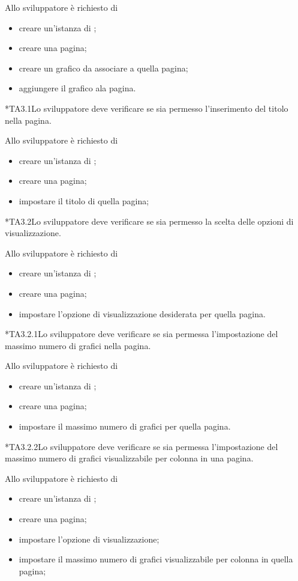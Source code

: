 		Allo sviluppatore è richiesto di
		\begin{itemize}
			\item creare un'istanza di \projectname{};
			\item creare una pagina;
			\item creare un grafico da associare a quella pagina;
			\item aggiungere il grafico ala pagina.
		\end{itemize}

	*{TA3.1}Lo sviluppatore deve verificare se sia permesso l'inserimento del titolo nella pagina.
		
		Allo sviluppatore è richiesto di
		\begin{itemize}
			\item creare un'istanza di \projectname{};
			\item creare una pagina;
			\item impostare il titolo di quella pagina;
		\end{itemize}

	*{TA3.2}Lo sviluppatore deve verificare se sia permesso la scelta delle opzioni di visualizzazione.
		
		Allo sviluppatore è richiesto di
		\begin{itemize}
			\item creare un'istanza di \projectname{};
			\item creare una pagina;
			\item impostare l'opzione di visualizzazione desiderata per quella pagina.
		\end{itemize}

	*{TA3.2.1}Lo sviluppatore deve verificare se sia permessa l'impostazione del massimo numero di grafici nella pagina.
		
		Allo sviluppatore è richiesto di
		\begin{itemize}
			\item creare un'istanza di \projectname{};
			\item creare una pagina;
			\item impostare il massimo numero di grafici per quella pagina.
		\end{itemize}

	*{TA3.2.2}Lo sviluppatore deve verificare se sia permessa l'impostazione del massimo numero di grafici visualizzabile per colonna in una pagina.
		
		Allo sviluppatore è richiesto di
		\begin{itemize}
			\item creare un'istanza di \projectname{};
			\item creare una pagina;
			\item impostare l'opzione di visualizzazione;
			\item impostare il massimo numero di grafici visualizzabile per colonna in quella pagina;
		\end{itemize}

